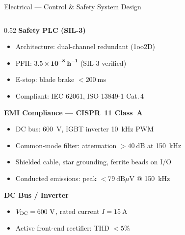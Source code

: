 \documentclass[aspectratio=169,11pt]{beamer}
\begin{document}
\begin{frame}[shrink=12]{Electrical --- Control \& Safety System Design}
  \begin{columns}[T]
    \begin{column}{0.52\textwidth}
      \textbf{Safety PLC (SIL-3)}
      \begin{itemize}
        \item Architecture: dual-channel redundant (1oo2D)
        \item PFH: $\mathbf{3.5\times10^{-8}~h^{-1}}$ (SIL-3 verified)
        \item E-stop: blade brake $< 200~\text{ms}$
        \item Compliant: IEC 62061, ISO 13849-1 Cat.\,4
      \end{itemize}

      \vspace{0.5em}
      \textbf{EMI Compliance --- CISPR~11 Class~A}
      \begin{itemize}
        \item DC bus: 600~V, IGBT inverter 10~kHz PWM
        \item Common-mode filter: attenuation $> 40~\text{dB}$ at 150~kHz
        \item Shielded cable, star grounding, ferrite beads on I/O
        \item Conducted emissions: peak $< 79~\text{dB}\mu\text{V}$ @ 150~kHz
              \checkmark
      \end{itemize}

      \vspace{0.5em}
      \textbf{DC Bus / Inverter}
      \begin{itemize}
        \item $V_{\rm DC} = 600~\text{V}$, rated current $I = 15~\text{A}$
        \item Active front-end rectifier: THD $< 5\%$
      \end{itemize}


\end{column}
\end{columns}
\end{frame}
\end{document}
